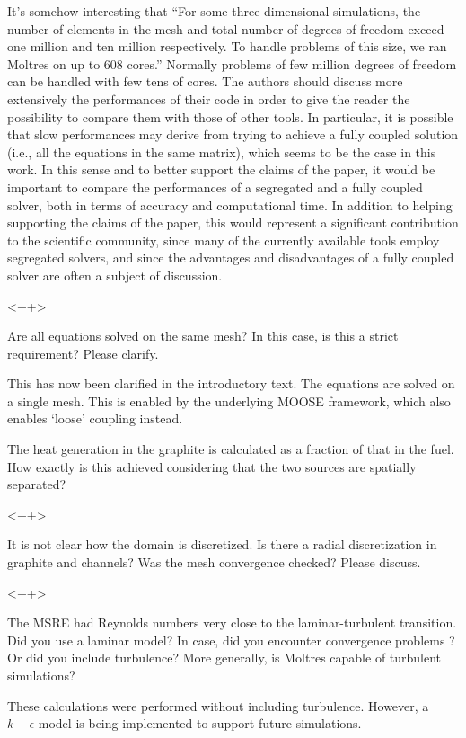 \documentclass[answers,11pt]{exam}
\begin{document}
\begin{questions}
\question It's somehow interesting that ``For some three-dimensional 
simulations, the number of elements in the mesh and total number of degrees of 
freedom exceed one million and ten million respectively. To handle problems of 
this size, we ran Moltres on up to 608 cores.'' Normally problems of few million degrees of freedom can be handled with few tens of cores. The authors should discuss more extensively the performances of their code in order to give the reader the possibility to compare them with those of other tools. In particular, it is possible that slow performances may derive from trying to achieve a fully coupled solution (i.e., all the equations in the same matrix), which seems to be the case in this work. In this sense and to better support the claims of the paper, it would be important to compare the performances of a segregated and a fully coupled  solver, both in terms of accuracy and computational time. In addition to helping supporting the claims of the paper, this
would represent a significant contribution to the scientific community, since many of the currently available tools employ segregated solvers, and since the advantages and disadvantages of a fully coupled solver are often a subject of discussion.
\begin{solution}
        <++>
\end{solution}


\question Are all equations solved on the same mesh? In this case, is this a strict requirement? Please clarify.
\begin{solution}
        This has now been clarified in the introductory text. The equations are 
        solved on a single mesh. This is enabled by the underlying MOOSE 
        framework, which also enables `loose' coupling instead.
\end{solution}

\question The heat generation in the graphite is calculated as a fraction of that in the fuel. How exactly is this achieved considering that the two sources are spatially separated?
\begin{solution}
        <++>
\end{solution}

\question It is not clear how the domain is discretized. Is there a radial discretization in graphite and channels? Was the mesh convergence checked? Please discuss.
\begin{solution}
       <++>
\end{solution}

\question The MSRE had Reynolds numbers very close to the laminar-turbulent transition. Did you use a laminar model? In case, did you encounter convergence problems ?
Or did you include turbulence? More generally, is Moltres capable of turbulent simulations?
\begin{solution}
        These calculations were performed without including turbulence. However, a $k-\epsilon$ model is being implemented to support future simulations.
\end{solution}


\end{questions}
\end{document}
